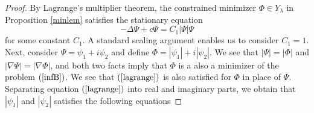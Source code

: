 \documentclass[12pt,reqno,a4paper]{amsart} %
\numberwithin{equation}{section}
\numberwithin{figure}{section}
\begin{document}
\begin{proof}
By Lagrange's multiplier theorem, the constrained minimizer $\Phi \in Y_{\lambda}$ in Proposition \ref{minlem} satisfies
the stationary equation
\begin{equation}
\label{lagrange}
-\Delta \Psi+c\Psi=C_1|\Psi|\Psi
\end{equation}
for some constant $C_1$. A standard scaling argument enables us to consider $C_1=1$.\\
\indent Next, consider $\Psi=\psi_1+i\psi_2$ and define $\Phi=|\psi_1|+i|\psi_2|$. We see that $|\Psi|=|\Phi|$ and $|\nabla\Psi|=|\nabla\Phi|$, and both two facts imply that $\Phi$ is a also a minimizer of the problem $(\ref{infB})$. We see that $(\ref{lagrange})$ is also satisfied for $\Phi$ in place of $\Psi$. Separating equation $(\ref{lagrange})$ into real and imaginary parts, we obtain that $|\psi_1|$ and $|\psi_2|$ satisfies the following equations


\end{proof}
\end{document}

